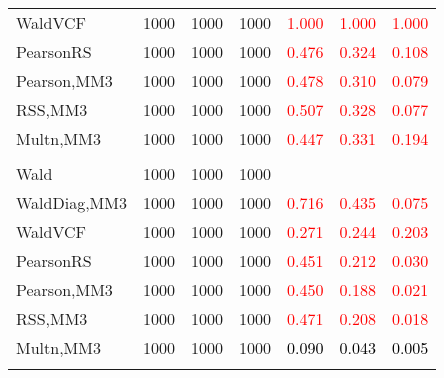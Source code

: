 \documentclass[
]{article}
\begin{document}
\begin{table}[H]
{\begin{tabular}[t]{lrrrrrr}
\hspace{1em}WaldVCF & 1000 & 1000 & 1000 & \textcolor{red}{1.000} & \textcolor{red}{1.000} & \textcolor{red}{1.000}\\
\hspace{1em}PearsonRS & 1000 & 1000 & 1000 & \textcolor{red}{0.476} & \textcolor{red}{0.324} & \textcolor{red}{0.108}\\
\hspace{1em}Pearson,MM3 & 1000 & 1000 & 1000 & \textcolor{red}{0.478} & \textcolor{red}{0.310} & \textcolor{red}{0.079}\\
\hspace{1em}RSS,MM3 & 1000 & 1000 & 1000 & \textcolor{red}{0.507} & \textcolor{red}{0.328} & \textcolor{red}{0.077}\\
\hspace{1em}Multn,MM3 & 1000 & 1000 & 1000 & \textcolor{red}{0.447} & \textcolor{red}{0.331} & \textcolor{red}{0.194}\\
\addlinespace[0.3em]
\multicolumn{7}{l}{\textbf{1F 15V}}\\
\hspace{1em}Wald & 1000 & 1000 & 1000 & \textcolor{black}{} & \textcolor{black}{} & \vphantom{1} \textcolor{black}{}\\
\hspace{1em}WaldDiag,MM3 & 1000 & 1000 & 1000 & \textcolor{red}{0.716} & \textcolor{red}{0.435} & \textcolor{red}{0.075}\\
\hspace{1em}WaldVCF & 1000 & 1000 & 1000 & \textcolor{red}{0.271} & \textcolor{red}{0.244} & \textcolor{red}{0.203}\\
\hspace{1em}PearsonRS & 1000 & 1000 & 1000 & \textcolor{red}{0.451} & \textcolor{red}{0.212} & \textcolor{red}{0.030}\\
\hspace{1em}Pearson,MM3 & 1000 & 1000 & 1000 & \textcolor{red}{0.450} & \textcolor{red}{0.188} & \textcolor{red}{0.021}\\
\hspace{1em}RSS,MM3 & 1000 & 1000 & 1000 & \textcolor{red}{0.471} & \textcolor{red}{0.208} & \textcolor{red}{0.018}\\
\hspace{1em}Multn,MM3 & 1000 & 1000 & 1000 & \textcolor{black}{0.090} & \textcolor{black}{0.043} & \textcolor{black}{0.005}\\
\addlinespace[0.3em]
\multicolumn{7}{l}{\textbf{2F 10V}}\\

\end{tabular}}
\end{table}
\end{document}
